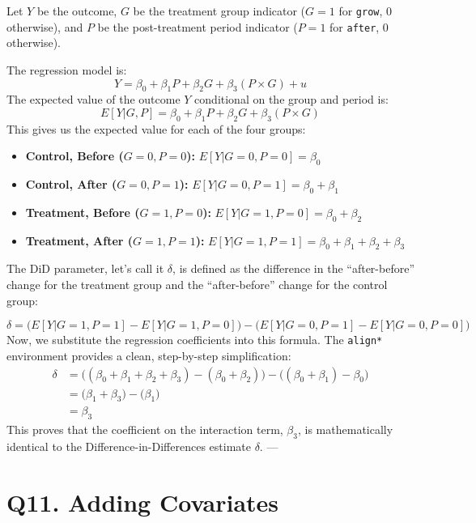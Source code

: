 \documentclass[
]{article}
\providecommand{\tightlist}{%
  \setlength{\itemsep}{0pt}\setlength{\parskip}{0pt}}
\begin{document}
Let \(Y\) be the outcome, \(G\) be the treatment group indicator
(\(G=1\) for \texttt{grow}, 0 otherwise), and \(P\) be the
post-treatment period indicator (\(P=1\) for \texttt{after}, 0
otherwise).

The regression model is: \[
Y = \beta_0 + \beta_1 P + \beta_2 G + \beta_3 (P \times G) + u
\] The expected value of the outcome \(Y\) conditional on the group and
period is: \[
E[Y | G, P] = \beta_0 + \beta_1 P + \beta_2 G + \beta_3 (P \times G)
\] This gives us the expected value for each of the four groups:

\begin{itemize}
\tightlist
\item
  \textbf{Control, Before (\(G=0, P=0\)):} \(E[Y | G=0, P=0] = \beta_0\)
\item
  \textbf{Control, After (\(G=0, P=1\)):}
  \(E[Y | G=0, P=1] = \beta_0 + \beta_1\)
\item
  \textbf{Treatment, Before (\(G=1, P=0\)):}
  \(E[Y | G=1, P=0] = \beta_0 + \beta_2\)
\item
  \textbf{Treatment, After (\(G=1, P=1\)):}
  \(E[Y | G=1, P=1] = \beta_0 + \beta_1 + \beta_2 + \beta_3\)
\end{itemize}

The DiD parameter, let's call it \(\delta\), is defined as the
difference in the ``after-before'' change for the treatment group and
the ``after-before'' change for the control group:

\[
\delta = \Big( E[Y | G=1, P=1] - E[Y | G=1, P=0] \Big) - \Big( E[Y | G=0, P=1] - E[Y | G=0, P=0] \Big)
\] Now, we substitute the regression coefficients into this formula. The
\texttt{align*} environment provides a clean, step-by-step
simplification: \[
\begin{align*}
\delta &= \Big( (\beta_0 + \beta_1 + \beta_2 + \beta_3) - (\beta_0 + \beta_2) \Big) - \Big( (\beta_0 + \beta_1) - \beta_0 \Big) \\
&= \Big( \beta_1 + \beta_3 \Big) - \Big( \beta_1 \Big) \\
&= \beta_3
\end{align*}
\] This proves that the coefficient on the interaction term,
\(\beta_3\), is mathematically identical to the
Difference-in-Differences estimate \(\delta\). ---

\section{Q11. Adding Covariates}\label{q11.-adding-covariates}
\end{document}
